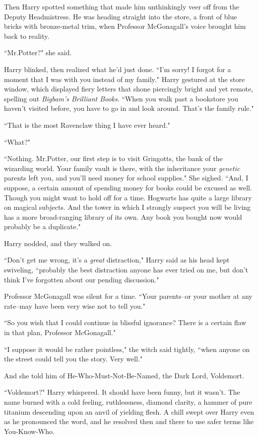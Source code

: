 Then Harry spotted something that made him unthinkingly veer off from the Deputy Headmistress. He was heading straight into the store, a front of blue bricks with bronze-metal trim, when Professor McGonagall's voice brought him back to reality.

``Mr.\?Potter?" she said.

Harry blinked, then realized what he'd just done. ``I'm sorry! I forgot for a moment that I was with you instead of my family." Harry gestured at the store window, which displayed fiery letters that shone piercingly bright and yet remote, spelling out \emph{Bigbam's Brilliant Books}. ``When you walk past a bookstore you haven't visited before, you have to go in and look around. That's the family rule."

``That is the most Ravenclaw thing I have ever heard."

``What?"

``Nothing. Mr.\?Potter, our first step is to visit Gringotts, the bank of the wizarding world. Your family vault is there, with the inheritance your \emph{genetic} parents left you, and you'll need money for school supplies." She sighed. ``And, I suppose, a certain amount of spending money for books could be excused as well. Though you might want to hold off for a time. Hogwarts has quite a large library on magical subjects. And the tower in which I strongly suspect you will be living has a more broad-ranging library of its own. Any book you bought now would probably be a duplicate."

Harry nodded, and they walked on.

``Don't get me wrong, it's a \emph{great} distraction," Harry said as his head kept swiveling, ``probably the best distraction anyone has ever tried on me, but don't think I've forgotten about our pending discussion."

Professor McGonagall was silent for a time. ``Your parents\---or your mother at any rate\---may have been very wise not to tell you."

``So you wish that I could continue in blissful ignorance? There is a certain flaw in that plan, Professor McGonagall."

``I suppose it would be rather pointless," the witch said tightly, ``when anyone on the street could tell you the story. Very well."

And she told him of He-Who-Must-Not-Be-Named, the Dark Lord, Voldemort.

``Voldemort?" Harry whispered. It should have been funny, but it wasn't. The name burned with a cold feeling, ruthlessness, diamond clarity, a hammer of pure titanium descending upon an anvil of yielding flesh. A chill swept over Harry even as he pronounced the word, and he resolved then and there to use safer terms like You-Know-Who.

